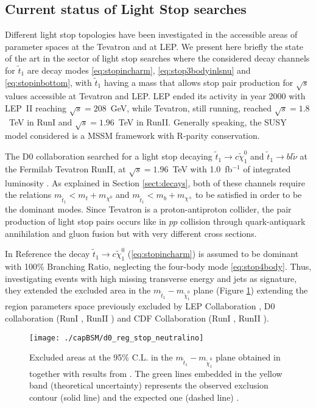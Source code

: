 \subsection{Current status of Light Stop searches}\label{sect:searches}
Different light stop topologies have been investigated in the accessible areas of parameter spaces at the Tevatron and at LEP. We present here briefly the state of the art in the sector of light stop searches where the considered decay channels for $\tilde{t}_1$ are decay modes \ref{eq:stopincharm}, \ref{eq:stop3bodyinlsnu} and \ref{eq:stopinbottom}, with $\tilde{t}_1$ having a mass that allows stop pair production for $\sqrt{s}$ values accessible at Tevatron and LEP. LEP ended its activity in year 2000 with LEP~II reaching $\sqrt{s}=208$~GeV, while Tevatron, still running, reached $\sqrt{s}=1.8$~TeV in RunI and $\sqrt{s}=1.96$~TeV in RunII. Generally speaking, the SUSY model considered is a MSSM framework with R-parity conservation.

The D0 collaboration \cite{d0} searched for a light stop decaying $\tilde{t}_1 \rightarrow c \tilde \chi^0_{1}$ and  $\tilde{t}_1 \rightarrow b l \tilde \nu$ at the Fermilab Tevatron RunII, at $\sqrt{s}=1.96$~TeV with 1.0~fb$^{-1}$ of integrated luminosity \cite{abazov-2008-665,abazov-2009-675}. As explained in Section \ref{sect:decays}, both of these channels require the relations $m_{\tilde{t}_1} < m_t + m_{\chi^0}$ and $m_{\tilde{t}_1} < m_b + m_{\chi^\pm}$ to be satisfied in order to be the dominant modes. Since Tevatron is a proton-antiproton collider, the pair production of light stop pairs occurs like in $pp$ collision through quark-antiquark annihilation and gluon fusion but with very different cross sections.

In Reference \cite{abazov-2008-665} the decay $\tilde{t}_1 \rightarrow c \tilde \chi^0_{1}$ (\ref{eq:stopincharm}) is assumed to be dominant with 100\% Branching Ratio, neglecting the four-body mode \ref{eq:stop4body}. Thus, investigating events with high missing transverse energy and jets as signature, they extended the excluded area in the $m_{\tilde{t}_1}-m_{\tilde \chi^0_{1}}$ plane (Figure \ref{d0_reg_stop_neutralino}) extending the region parameters space previously excluded by LEP Collaboration \cite{lepsusy-charm}, D0 collaboration (RunI \cite{abazov-2004}, RunII \cite{abazov-2007}) and CDF Collaboration (RunI \cite{affolder-2000}, RunII \cite{aaltonen-2007}).

\begin{figure}[htb]\begin{center}
\texttt{[image: ./capBSM/d0\_reg\_stop\_neutralino]}\caption{Excluded areas at the 95\% C.L. in the $m_{\tilde{t}_1}-m_{\tilde \chi^0_{1}}$ plane obtained in \cite{abazov-2008-665} together with results from \cite{lepsusy-charm,aaltonen-2007,abazov-2007}. The green lines embedded in the yellow band (theoretical uncertainty) represents  the observed exclusion contour (solid line) and the expected one (dashed line) \cite{abazov-2008-665}.}
\label{d0_reg_stop_neutralino}\end{center}\end{figure} 

